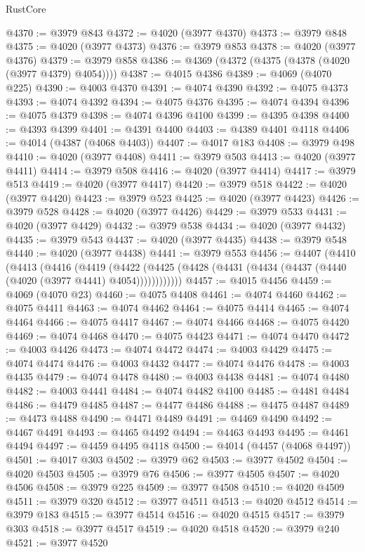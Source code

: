 \begin{lexlean}{RustCore}
\begin{coremodule}
@4370 := @3979 @843
@4372 := @4020 (@3977 @4370)
@4373 := @3979 @848
@4375 := @4020 (@3977 @4373)
@4376 := @3979 @853
@4378 := @4020 (@3977 @4376)
@4379 := @3979 @858
@4386 := @4369 (@4372 (@4375 (@4378 (@4020 (@3977 @4379) @4054))))
@4387 := @4015 @4386
@4389 := @4069 (@4070 @225)
@4390 := @4003 @4370
@4391 := @4074 @4390
@4392 := @4075 @4373
@4393 := @4074 @4392
@4394 := @4075 @4376
@4395 := @4074 @4394
@4396 := @4075 @4379
@4398 := @4074 @4396 @4100
@4399 := @4395 @4398
@4400 := @4393 @4399
@4401 := @4391 @4400
@4403 := @4389 @4401 @4118
@4406 := @4014 (@4387 (@4068 @4403))
@4407 := @4017 @183
@4408 := @3979 @498
@4410 := @4020 (@3977 @4408)
@4411 := @3979 @503
@4413 := @4020 (@3977 @4411)
@4414 := @3979 @508
@4416 := @4020 (@3977 @4414)
@4417 := @3979 @513
@4419 := @4020 (@3977 @4417)
@4420 := @3979 @518
@4422 := @4020 (@3977 @4420)
@4423 := @3979 @523
@4425 := @4020 (@3977 @4423)
@4426 := @3979 @528
@4428 := @4020 (@3977 @4426)
@4429 := @3979 @533
@4431 := @4020 (@3977 @4429)
@4432 := @3979 @538
@4434 := @4020 (@3977 @4432)
@4435 := @3979 @543
@4437 := @4020 (@3977 @4435)
@4438 := @3979 @548
@4440 := @4020 (@3977 @4438)
@4441 := @3979 @553
@4456 := @4407
    (@4410
      (@4413
        (@4416
          (@4419
            (@4422 (@4425 (@4428 (@4431 (@4434 (@4437 (@4440 (@4020 (@3977 @4441) @4054))))))))))))
@4457 := @4015 @4456
@4459 := @4069 (@4070 @23)
@4460 := @4075 @4408
@4461 := @4074 @4460
@4462 := @4075 @4411
@4463 := @4074 @4462
@4464 := @4075 @4414
@4465 := @4074 @4464
@4466 := @4075 @4417
@4467 := @4074 @4466
@4468 := @4075 @4420
@4469 := @4074 @4468
@4470 := @4075 @4423
@4471 := @4074 @4470
@4472 := @4003 @4426
@4473 := @4074 @4472
@4474 := @4003 @4429
@4475 := @4074 @4474
@4476 := @4003 @4432
@4477 := @4074 @4476
@4478 := @4003 @4435
@4479 := @4074 @4478
@4480 := @4003 @4438
@4481 := @4074 @4480
@4482 := @4003 @4441
@4484 := @4074 @4482 @4100
@4485 := @4481 @4484
@4486 := @4479 @4485
@4487 := @4477 @4486
@4488 := @4475 @4487
@4489 := @4473 @4488
@4490 := @4471 @4489
@4491 := @4469 @4490
@4492 := @4467 @4491
@4493 := @4465 @4492
@4494 := @4463 @4493
@4495 := @4461 @4494
@4497 := @4459 @4495 @4118
@4500 := @4014 (@4457 (@4068 @4497))
@4501 := @4017 @303
@4502 := @3979 @62
@4503 := @3977 @4502
@4504 := @4020 @4503
@4505 := @3979 @76
@4506 := @3977 @4505
@4507 := @4020 @4506
@4508 := @3979 @225
@4509 := @3977 @4508
@4510 := @4020 @4509
@4511 := @3979 @320
@4512 := @3977 @4511
@4513 := @4020 @4512
@4514 := @3979 @183
@4515 := @3977 @4514
@4516 := @4020 @4515
@4517 := @3979 @303
@4518 := @3977 @4517
@4519 := @4020 @4518
@4520 := @3979 @240
@4521 := @3977 @4520

\end{coremodule}
\end{lexlean}
